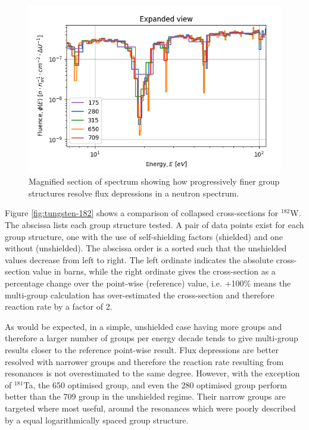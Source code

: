 \begin{figure}[H]
  \centering
  \includegraphics[width=\linewidth]{w_spectrum_detail}
  \caption{Magnified section of spectrum showing how progressively finer group structures resolve flux depressions in a neutron spectrum.}
  \label{fig:spectrum_detail}
\end{figure}

Figure \ref{fig:tungsten-182} shows a comparison of collapsed cross-sections for $^{182}$W. The abscissa lists each group structure tested. A pair of data points exist for each group structure, one with the use of self-shielding factors (shielded) and one without (unshielded). The abscissa order is a sorted such that the unshielded values decrease from left to right. The left ordinate indicates the absolute cross-section value in barns, while the right ordinate gives the cross-section as a percentage change over the point-wise (reference) value, i.e. +100\% means the multi-group calculation has over-estimated the cross-section and therefore reaction rate by a factor of 2.

As would be expected, in a simple, unshielded case having more groups and therefore a larger number of groups per energy decade tends to give multi-group results closer to the reference point-wise result. Flux depressions are better resolved with narrower groups and therefore the reaction rate resulting from resonances is not overestimated to the same degree. However, with the exception of $^{181}$Ta, the 650 optimised group, and even the 280 optimised group perform better than the 709 group in the unshielded regime. Their narrow groups are targeted where most useful, around the resonances which were poorly described by a equal logarithmically spaced group structure.

